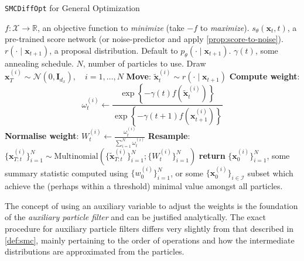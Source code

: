 \begin{algorithm}[ht]
    \caption{\texttt{SMCDiffOpt} for General Optimization} \label{alg:smc-opt}
    \begin{algorithmic}
        \Require $f: \mathcal{X} \to \mathbb{R}$, an objective function to \emph{minimize} (take $-f$ to \emph{maximize}).
        \Require $s_\theta(\mathbf{x}_t, t)$, a pre-trained score network (or noise-predictor and apply \autoref{prop:score-to-noise}).
        \Require $r(\cdot \mid \mathbf{x}_{t+1})$, a proposal distribution. Default to $p_\theta(\cdot \mid \mathbf{x}_{t+1})$.
        \Require $\gamma(t)$, some annealing schedule.
        \Require $N$, number of particles to use.
        \State Draw $\mathbf{x}_T^{(i)} \sim \mathcal{N}(0, \mathbf{I}_{d_x}),\quad i=1,\ldots,N$
                \State \textbf{Move}: $\tilde{\mathbf{x}}_{t}^{(i)} \sim r(\cdot \mid \mathbf{x}_{t+1})$
                \State \textbf{Compute weight}:
                \begin{equation}
                    \omega_t^{(i)} \gets \frac{\exp\left\{-\gamma(t) f(\tilde{\mathbf{x}}_t^{(i)})\right\}}{\exp\left\{-\gamma(t+1) f(\mathbf{x}_{t+1}^{(i)})\right\}} \label{eq:weight-formula}
                \end{equation}
                \State \textbf{Normalise weight}: $W_t^{(i)} \gets \frac{\omega_t^{(i)}}{\sum_{i=1}^N \omega_t^{(i)}}$
                \State \textbf{Resample}: $\{\mathbf{x}_{T:t}^{(i)}\}_{i=1}^N \sim \text{Multinomial}\left(\{\tilde{\mathbf{x}}_{T:t}^{(i)}\}_{i=1}^N; \{W_t^{(i)}\}_{i=1}^N\right)$
            \EndFor
        \EndFor
        \State \textbf{return} $\{\mathbf{x}_0^{(i)}\}_{i=1}^N$, some summary statistic computed
        using $\{w_0^{(i)}\}_{i=1}^N$, or some $\{\mathbf{x}_0^{(i)}\}_{i \in \mathcal{I}}$
        subset which achieve the (perhaps within a threshold) minimal value amongst all particles.
    \end{algorithmic}
\end{algorithm}

\begin{remark}
    The concept of using an auxiliary variable to adjust the weights is the foundation of the
    \emph{auxiliary particle filter} \parencite{chopinIntroductionSequentialMonte2020} and can be
    justified analytically. The exact procedure for auxiliary particle filters differs very slightly
    from that described in \autoref{def:smc}, mainly pertaining to the order of operations and how the
    intermediate distributions are approximated from the particles.
\end{remark}

